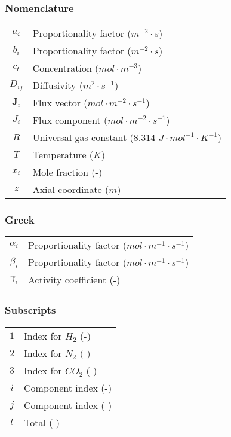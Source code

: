 \documentclass[twocolumn]{article}
\begin{document}
\subsubsection*{Nomenclature}
\begin{table}[H]
    \begin{tabular}{c l}  
      $a_i$ & Proportionality factor ($ m^{-2} \cdot s $) \\     
      $b_i$ & Proportionality factor ($ m^{-2} \cdot s $) \\     
      $c_t$ & Concentration ($mol \cdot m^{-3}$) \\
      $D_{ij}$ & Diffusivity ($m^2 \cdot s^{-1}$) \\
      $\textbf{J}_i$ & Flux vector ($mol \cdot m^{-2} \cdot s^{-1}$) \\
      $J_i$ & Flux component ($mol \cdot m^{-2} \cdot s^{-1}$) \\   
      $R$ & Universal gas constant (8.314 $J \cdot mol^{-1} \cdot K^{-1}$) \\  
      $T$ & Temperature ($K$) \\       
      $x_i$ & Mole fraction (-)\\
      $z$ & Axial coordinate ($m$) \\
    \end{tabular}
\end{table}
\subsubsection*{Greek}
\begin{table}[H]
    \begin{tabular}{c l} 
      $\alpha_i$ & Proportionality factor ($mol \cdot m^{-1} \cdot s^{-1}$) \\
      $\beta_i$ & Proportionality factor ($mol \cdot m^{-1} \cdot s^{-1}$) \\
      $\gamma_i$ & Activity coefficient (-) \\
    \end{tabular}
\end{table}
\subsubsection*{Subscripts}
\begin{table}[H]
    \begin{tabular}{c l} 
      $1$ & Index for $H_2$ (-)\\
      $2$ & Index for $N_2$ (-)\\
      $3$ & Index for $CO_2$ (-)\\
      $i$ & Component index (-)\\
      $j$ & Component index (-) \\
      $t$ & Total (-) \\
    \end{tabular}
\end{table}
\end{document}
